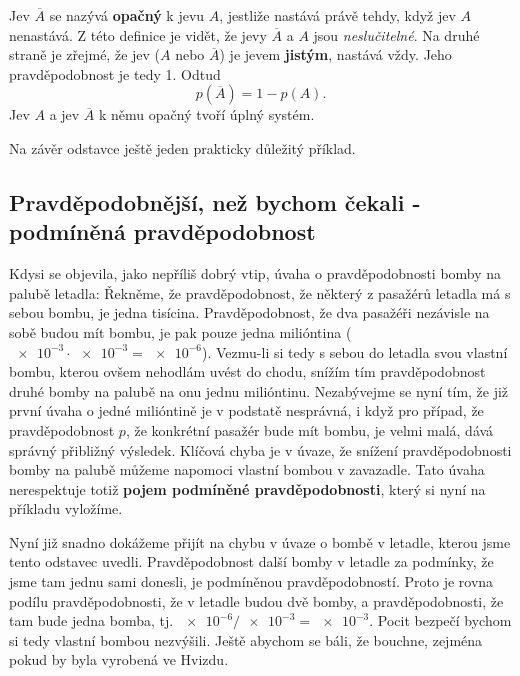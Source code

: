       Jev \(\overline{A}\) se nazývá \textbf{opačný} k jevu \(A\), jestliže nastává právě tehdy, 
      když jev \(A\) nenastává. Z této definice je vidět, že jevy \(\overline{A}\) a \(A\) jsou 
      \emph{neslučitelné}. Na druhé straně je zřejmé, že jev (\(A\) nebo \(\overline{A}\)) je jevem 
      \textbf{jistým}, nastává vždy. Jeho pravděpodobnost je tedy \num{1}. Odtud
      \begin{equation}\label{mai:eq054}
        p(\overline{A}) = 1 - p(A).
      \end{equation}
      Jev \(A\) a jev \(\overline{A}\) k němu opačný tvoří úplný systém.
      
      Na závěr odstavce ještě jeden prakticky důležitý příklad.
      
      

    \subsection{Pravděpodobnější, než bychom čekali - podmíněná pravděpodobnost}
      Kdysi se objevila, jako nepříliš dobrý vtip, úvaha o pravděpodobnosti bomby na palubě letadla:
      Řekněme, že pravděpodobnost, že některý z pasažérů letadla má s sebou bombu, je jedna
      tisícina. Pravděpodobnost, že dva pasažéři nezávisle na sobě budou mít bombu, je pak pouze
      jedna milióntina (\(\num{e-3}\cdot\num{e-3}= \num{e-6}\)). Vezmu-li si tedy s sebou do 
      letadla svou vlastní bombu, kterou ovšem nehodlám uvést do chodu, snížím tím pravděpodobnost 
      druhé bomby na palubě na onu jednu milióntinu. Nezabývejme se nyní tím, že již první úvaha o 
      jedné milióntině je v podstatě nesprávná, i když pro případ, že pravděpodobnost \(p\), že 
      konkrétní pasažér bude mít bombu, je velmi malá, dává správný přibližný výsledek. Klíčová 
      chyba je v úvaze, že snížení pravděpodobnosti bomby na palubě můžeme napomoci vlastní bombou 
      v zavazadle. Tato úvaha nerespektuje totiž \textbf{pojem podmíněné pravděpodobnosti}, který 
      si nyní na příkladu vyložíme.
      
      
      
      Nyní již snadno dokážeme přijít na chybu v úvaze o bombě v letadle, kterou jsme tento 
      odstavec uvedli. Pravděpodobnost další bomby v letadle za podmínky, že jsme tam jednu sami 
      donesli, je podmíněnou pravděpodobností. Proto je rovna podílu pravděpodobnosti, že v letadle 
      budou dvě bomby, a pravděpodobnosti, že tam bude jedna bomba, tj. \(\num{e-6}/\num{e-3} = 
      \num{e-3}\). Pocit bezpečí bychom si tedy vlastní bombou nezvýšili. Ještě abychom se báli, že 
      bouchne, zejména pokud by byla vyrobená ve Hvizdu.
      
